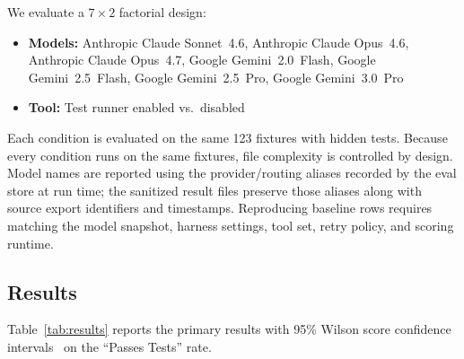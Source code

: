 \documentclass[11pt,letterpaper]{article}
\begin{document}
We evaluate a $7 \times 2$ factorial design:

\begin{itemize}[leftmargin=2em]
\item \textbf{Models:} Anthropic Claude Sonnet~4.6, Anthropic Claude Opus~4.6, Anthropic Claude Opus~4.7, Google Gemini~2.0~Flash, Google Gemini~2.5~Flash, Google Gemini~2.5~Pro, Google Gemini~3.0~Pro
\item \textbf{Tool:} Test runner enabled vs.\ disabled
\end{itemize}

Each condition is evaluated on the same 123 fixtures with hidden tests. Because every condition runs on the same fixtures, file complexity is controlled by design.
Model names are reported using the provider/routing aliases recorded by the eval store at run time; the sanitized result files preserve those aliases along with source export identifiers and timestamps. Reproducing baseline rows requires matching the model snapshot, harness settings, tool set, retry policy, and scoring runtime.

\subsection{Results}

Table~\ref{tab:results} reports the primary results with 95\% Wilson score confidence intervals~\citep{wilson1927probable} on the ``Passes Tests'' rate.
\end{document}
